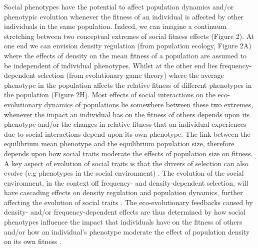 \documentclass{article}
\begin{document}
Social phenotypes have the potential to affect population dynamics and/or phenotypic evolution whenever the fitness of an individual is affected by other individuals in the same population. Indeed, we can imagine a continuum stretching between two conceptual extremes of social fitness effects (Figure 2). At one end we can envision density regulation (from population ecology, Figure 2A) where the effects of density on the mean fitness of a population are assumed to be independent of individual phenotypes. Whilst at the other end lies frequency-dependent selection (from evolutionary game theory) where the average phenotype in the population affects the relative fitness of different phenotypes in the population (Figure 2H). Most effects of social interactions on the eco-evolutionary dynamics of populations lie somewhere between these two extremes, whenever the impact an individual has on the fitness of others depends upon its phenotype and/or the changes in relative fitness that an individual experiences due to social interactions depend upon its own phenotype. The link between the equilibrium mean phenotype and the equilibrium population size, therefore depends upon how social traits moderate the effects of population size on fitness. A key aspect of evolution of social traits is that the drivers of selection can also evolve (e.g phenotypes in the social environment) \citep{West-Eberhard1979, Moore1997}. The evolution of the social environment, in the context off frequency- and density-dependent selection, will have cascading effects on density regulation and population dynamics, further affecting the evolution of social traits \citep{Heino1998}. The eco-evolutionary feedbacks caused by density- and/or frequency-dependent effects are thus determined by how social phenotypes influence the impact that individuals have on the fitness of others and/or how an individual's phenotype moderate the effect of population density on its own fitness \citep{Engen2020}. 
\end{document}
